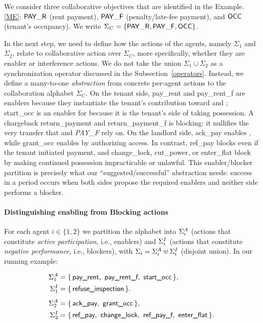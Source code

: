 \documentclass{article}
\begin{document}
  We consider three collaborative objectives that are identified in the Example.\ref{ME}:
  \(\mathsf{PAY\_R}\) (rent payment), \(\mathsf{PAY\_F}\) (penalty/late-fee payment), and \(\mathsf{OCC}\) (tenant’s occupancy).
  We write \(\Sigma_C=\{\mathsf{PAY\_R},\mathsf{PAY\_F},\mathsf{OCC}\}\).
  
  In the next step, we need to define how the actions of the agents, namely $\Sigma_1$ and $\Sigma_2$, relate to collaborative action over $\Sigma_C$, more specifically, whether they are enabler or interference actions. We do not take the union \(\Sigma_1\cup\Sigma_2\) as a synchronization operator discussed in the Subsection~\ref {operators}. Instead, we define a many-to-one \emph{abstraction} from concrete per-agent actions to the collaboration alphabet \(\Sigma_C\).
   On the tenant side, \textsf{pay\_rent} and \textsf{pay\_rent\_f} are enablers because they instantiate the tenant’s contribution toward \PAY and \PAYF; \textsf{start\_occ} is an enabler for \OCC because it is the tenant’s side of taking possession. A chargeback \textsf{return\_payment} and \textsf{return\_payment\_f}  is blocking: it nullifies the very transfer that \PAY and \emph{PAY\_F} rely on. On the landlord side, \textsf{ack\_pay} enables \PAY, while \textsf{grant\_occ} enables \OCC by authorizing access. In contrast, \textsf{ref\_pay} blocks \PAY even if the tenant initiated payment, and \textsf{change\_lock}, \textsf{cut\_power}, or \textsf{enter\_flat} block \OCC by making continued possession impracticable or unlawful. This enabler/blocker partition is precisely what our “suggested/successful” abstraction needs: success in a period occurs when both sides propose the required enablers and neither side performs a blocker.
  
  
  \paragraph{Distinguishing enabling from Blocking actions} For each agent \(i\in\{1,2\}\) we partition the alphabet into
  \(\Sigma^{A}_{i}\) (actions that constitute \emph{active participation}, i.e., enablers)
  and \(\Sigma^{I}_{i}\) (actions that constitute \emph{negative performance}, i.e., blockers), with
  \(\Sigma_{i}=\Sigma^{A}_{i}\uplus\Sigma^{I}_{i}\) (disjoint union). In our running example:
  
  \[
  \begin{aligned}
  \SigA{1} &= \{\,\textsf{pay\_rent},\ \textsf{pay\_rent\_f},\ \textsf{start\_occ}\,\},\\
  \SigI{1} &= \{\,\textsf{refuse\_inspection}\,\}.\\[4pt]
  \SigA{2} &= \{\,\textsf{ack\_pay},\ \textsf{grant\_occ}\,\},\\
  \SigI{2} &= \{\,\textsf{ref\_pay},\ \textsf{change\_lock},\ \textsf{ref\_pay\_f} ,\ \textsf{enter\_flat}\,\}.
  \end{aligned}
  \]
  
\end{document}
